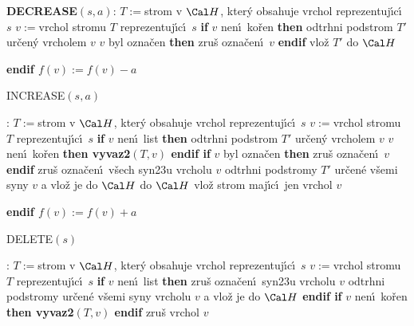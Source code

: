 \documentclass[a4paper,12pt]{article}
\begin{document}
{\bf DECREASE$(s,a)$}:\newline 
$T:=$strom v $\Cal H$, kter\'y obsahuje vrchol reprezentuj\'\i c\'\i\ $
s$\newline 
$v:=$vrchol stromu $T$ reprezentuj\'\i c\'\i\ $s$\newline 
{\bf if} $v$ nen\'\i\ ko\v ren {\bf then \newline 
\phantom{{\rm ---}}}odtrhni podstrom $T'$ ur\v cen\'y vrcholem $v$\newline 
{} $v$ byl ozna\v cen {\bf then} zru\v s ozna\v cen\'\i\ $
v$ {\bf endif\newline 
\phantom{{\rm ---}}}vlo\v z $T'$ do $\Cal H$\newline 
{\bf endif\newline 
$f(v):=f(v)-a$
\bigskip

INCREASE$(s,a)$}:\newline 
$T:=$strom v $\Cal H$, kter\'y obsahuje vrchol reprezentuj\'\i c\'\i\ $
s$\newline 
$v:=$vrchol stromu $T$ reprezentuj\'\i c\'\i\ $s$\newline 
{\bf if} $v$ nen\'\i\ list {\bf then \newline 
\phantom{{\rm ---}}}odtrhni podstrom $T'$ ur\v cen\'y vrcholem $v$\newline 
\phantom{---}{\bf if} $v$ nen\'\i\ ko\v ren {\bf then vyvaz2$(T,v
)$ endif\newline 
\phantom{{\rm ---}}if} $v$ byl ozna\v cen {\bf then} zru\v s ozna\v cen\'\i\ $
v$ {\bf endif\newline 
\phantom{{\rm ---}}}zru\v s ozna\v cen\'\i\ v\v sech syn\accent23u vrcholu $
v$\newline 
\phantom{---}odtrhni podstromy $T'$ ur\v cen\'e v\v semi syny $v$ 
a vlo\v z je do $\Cal H$\newline 
\phantom{{\bf ---}}do $\Cal H$ vlo\v z strom maj\'\i c\'\i\ jen vrchol $
v$\newline 
{\bf endif\newline 
$f(v):=f(v)+a$
\bigskip

DELETE$(s)$}:\newline 
$T:=$strom v $\Cal H$, kter\'y obsahuje vrchol reprezentuj\'\i c\'\i\ $
s$\newline 
$v:=$vrchol stromu $T$ reprezentuj\'\i c\'\i\ $s$\newline 
{\bf if} $v$ nen\'\i\ list {\bf then\newline 
\phantom{{\rm ---}}}zru\v s ozna\v cen\'\i\ syn\accent23u vrcholu $
v$\newline 
\phantom{---}odtrhni podstromy ur\v cen\'e v\v semi syny 
vrcholu $v$ a vlo\v z je do $\Cal H$\newline 
{\bf endif\newline 
if} $v$ nen\'\i\ ko\v ren {\bf then vyvaz2$(T,v)$ endif\newline 
}
zru\v s vrchol $v$
\bigskip
\end{document}
